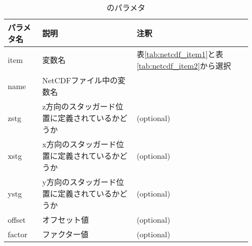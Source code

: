 {\small
\begin{table}[tbh]
\begin{center}
\caption{のパラメタ}
\label{tab:namelist_netcdf_item}
\begin{tabularx}{150mm}{llX} \hline
\rowcolor[gray]{0.9}
パラメタ名 & 説明    & 注釈 \\ \hline
item     & 変数名 & 表\ref{tab:netcdf_item1}と表\ref{tab:netcdf_item2}から選択   \\ \hline
name     & NetCDFファイル中の変数名 & \\ \hline
zstg     & z方向のスタッガード位置に定義されているかどうか & (optional) \\ \hline
xstg     & x方向のスタッガード位置に定義されているかどうか & (optional) \\ \hline
ystg     & y方向のスタッガード位置に定義されているかどうか & (optional) \\ \hline
offset   & オフセット値 & (optional) \\ \hline
factor   & ファクター値 & (optional) \\ \hline
\end{tabularx}
\end{center}
\end{table}
}

